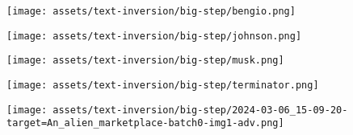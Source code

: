\begin{figure*}[h]
\vspace{1ex}
\begin{minipage}[t]{.025\textwidth}
     \vspace{0pt}
\end{minipage}%
\hspace{1ex}
\begin{minipage}[t]{0.98\figwidth}
    \vspace{0pt}
    \begin{subfigure}[t]{0.2\textwidth}
        \texttt{[image: assets/text-inversion/big-step/bengio.png]}
    \end{subfigure}%
    \begin{subfigure}[t]{0.2\textwidth}
        \texttt{[image: assets/text-inversion/big-step/johnson.png]}
    \end{subfigure}%
    \begin{subfigure}[t]{0.2\textwidth}
        \texttt{[image: assets/text-inversion/big-step/musk.png]}
    \end{subfigure}%
    \begin{subfigure}[t]{0.2\textwidth}
        \texttt{[image: assets/text-inversion/big-step/terminator.png]}
    \end{subfigure}%
    \begin{subfigure}[t]{0.2\textwidth}
        \texttt{[image: assets/text-inversion/big-step/2024-03-06\_15-09-20-target=An\_alien\_marketplace-batch0-img1-adv.png]}
    \end{subfigure}%
\end{minipage}



\end{figure*}
